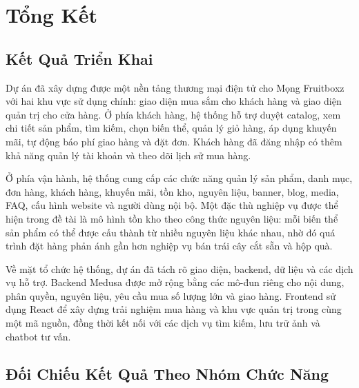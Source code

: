 \chapter{Tổng Kết}

\section{Kết Quả Triển Khai}

Dự án đã xây dựng được một nền tảng thương mại điện tử cho Mọng Fruitboxz với hai khu vực sử dụng chính: giao diện mua sắm cho khách hàng và giao diện quản trị cho cửa hàng. Ở phía khách hàng, hệ thống hỗ trợ duyệt catalog, xem chi tiết sản phẩm, tìm kiếm, chọn biến thể, quản lý giỏ hàng, áp dụng khuyến mãi, tự động báo phí giao hàng và đặt đơn. Khách hàng đã đăng nhập có thêm khả năng quản lý tài khoản và theo dõi lịch sử mua hàng.

Ở phía vận hành, hệ thống cung cấp các chức năng quản lý sản phẩm, danh mục, đơn hàng, khách hàng, khuyến mãi, tồn kho, nguyên liệu, banner, blog, media, FAQ, cấu hình website và người dùng nội bộ. Một đặc thù nghiệp vụ được thể hiện trong đề tài là mô hình tồn kho theo công thức nguyên liệu: mỗi biến thể sản phẩm có thể được cấu thành từ nhiều nguyên liệu khác nhau, nhờ đó quá trình đặt hàng phản ánh gần hơn nghiệp vụ bán trái cây cắt sẵn và hộp quà.

Về mặt tổ chức hệ thống, dự án đã tách rõ giao diện, backend, dữ liệu và các dịch vụ hỗ trợ. Backend Medusa được mở rộng bằng các mô-đun riêng cho nội dung, phân quyền, nguyên liệu, yêu cầu mua số lượng lớn và giao hàng. Frontend sử dụng React để xây dựng trải nghiệm mua hàng và khu vực quản trị trong cùng một mã nguồn, đồng thời kết nối với các dịch vụ tìm kiếm, lưu trữ ảnh và chatbot tư vấn.

\section{Đối Chiếu Kết Quả Theo Nhóm Chức Năng}

